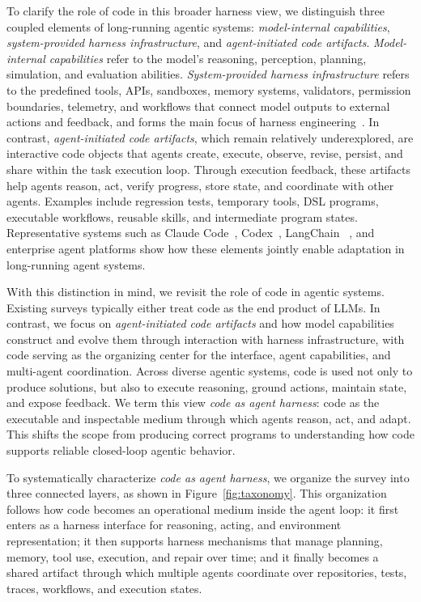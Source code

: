 \documentclass{llmxive}
\begin{document}
To clarify the role of code in this broader harness view, we
distinguish three coupled elements of long-running agentic systems:
\emph{model-internal capabilities}, \emph{system-provided harness
infrastructure}, and \emph{agent-initiated code artifacts}.
\emph{Model-internal capabilities} refer to the model's reasoning,
perception, planning, simulation, and evaluation abilities.
\emph{System-provided harness infrastructure} refers to the
predefined tools, APIs, sandboxes, memory systems, validators,
permission boundaries, telemetry, and workflows that connect model
outputs to external actions and feedback, and forms the main focus
of harness engineering~\cite{openai2026harnessengineering,langchainanatomyharness2026}.
In contrast, \emph{agent-initiated code artifacts}, which remain
relatively underexplored, are interactive code objects that agents
create, execute, observe, revise, persist, and share within the task
execution loop. Through execution feedback, these artifacts help
agents reason, act, verify progress, store state, and coordinate
with other agents. Examples include regression tests, temporary
tools, DSL programs, executable workflows, reusable skills, and
intermediate program states. Representative systems such as Claude
Code~\cite{claudecode2025}, Codex~\cite{codex2025}, LangChain
~\cite{langchaindeepagentsharness2026}, and enterprise agent
platforms show how these elements jointly enable adaptation in long-running
agent systems.



With this distinction in mind, we revisit the role of code
in agentic systems. Existing surveys typically either treat code as the end product of
LLMs. In contrast, we focus on \emph{agent-initiated code artifacts} and
how model capabilities construct and evolve them through
interaction with harness infrastructure, with code serving as the
organizing center for the interface, agent capabilities,
and multi-agent coordination.
Across diverse agentic systems, code is used not only to produce
solutions, but also to execute reasoning, ground actions, maintain
state, and expose feedback. We term this view \emph{code as agent
harness}: code as the executable and inspectable medium through
which agents reason, act, and adapt. This shifts the scope from producing correct programs to
understanding how code supports reliable closed-loop agentic
behavior.



To systematically characterize \emph{code as agent harness}, we
organize the survey into three connected layers, as shown in
Figure~\ref{fig:taxonomy}.
This organization follows how code becomes an operational medium
inside the agent loop: it first enters as a harness interface
for reasoning, acting, and environment representation; it then
supports harness mechanisms that manage planning, memory, tool
use, execution, and repair over time; and it finally becomes a
shared artifact through which multiple agents coordinate over
repositories, tests, traces, workflows, and execution states.
\end{document}
